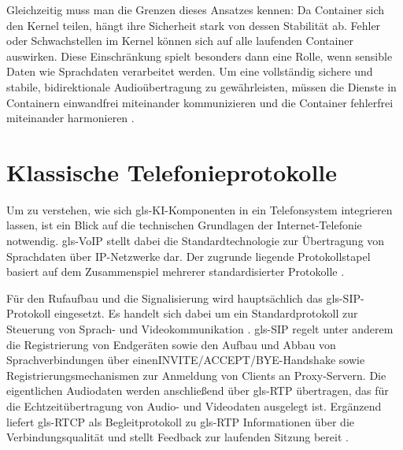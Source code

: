 Gleichzeitig muss man die Grenzen dieses Ansatzes kennen: Da Container sich den Kernel teilen, hängt ihre Sicherheit stark von dessen Stabilität ab. Fehler oder Schwachstellen im Kernel können sich auf alle laufenden Container auswirken. Diese Einschränkung spielt besonders dann eine Rolle, wenn sensible Daten wie Sprachdaten verarbeitet werden. Um eine vollständig sichere und stabile, bidirektionale Audioübertragung zu gewährleisten, müssen die Dienste in Containern einwandfrei miteinander kommunizieren und die Container fehlerfrei miteinander harmonieren \parencite{Antonova2025,ETSI-REL,ReliabilityVirtualizedNetworks}.

\vspace{1em}

\section[Klassische Telefonieprotokolle]{Klassische Telefonieprotokolle}

Um zu verstehen, wie sich \gls{gls-KI}-Komponenten in ein Telefonsystem integrieren lassen, ist ein Blick auf die technischen Grundlagen der Internet-Telefonie notwendig. \gls{gls-VoIP} stellt dabei die Standardtechnologie zur Übertragung von Sprachdaten über IP-Netzwerke dar. Der zugrunde liegende Protokollstapel basiert auf dem Zusammenspiel mehrerer standardisierter Protokolle \parencite{rfc3261,ITU-T-G114}.

Für den Rufaufbau und die Signalisierung wird hauptsächlich das \gls{gls-SIP}-Protokoll eingesetzt. Es handelt sich dabei um ein Standardprotokoll zur Steuerung von Sprach- und Videokommunikation \parencite{rfc3261}. \gls{gls-SIP} regelt unter anderem die Registrierung von Endgeräten sowie den Aufbau und Abbau von Sprachverbindungen über einen\newline INVITE/ACCEPT/BYE-Handshake sowie Registrierungsmechanismen zur Anmeldung von Clients an Proxy-Servern. Die eigentlichen Audiodaten werden anschlie\ss end über \gls{gls-RTP} übertragen, das für die Echtzeitübertragung von Audio- und Videodaten ausgelegt ist. Ergänzend liefert \gls{gls-RTCP} als Begleitprotokoll zu \gls{gls-RTP} Informationen über die Verbindungsqualität und stellt Feedback zur laufenden Sitzung bereit \parencite{rfc3550}.

